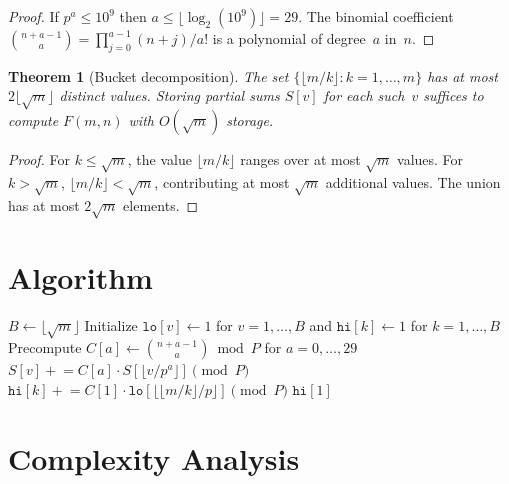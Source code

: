 \documentclass[12pt,a4paper]{article}
\newtheorem{theorem}{Theorem}
\newcommand{\Fmn}{F(m,n)}
\begin{document}
\begin{proof}
If $p^a \le 10^9$ then $a \le \lfloor \log_2(10^9) \rfloor = 29$. The binomial coefficient $\binom{n+a-1}{a} = \prod_{j=0}^{a-1} (n+j) / a!$ is a polynomial of degree~$a$ in~$n$.
\end{proof}

\begin{theorem}[Bucket decomposition]\label{thm:bucket}
The set $\{\lfloor m/k \rfloor : k = 1, \ldots, m\}$ has at most $2\lfloor\sqrt{m}\rfloor$ distinct values. Storing partial sums $S[v]$ for each such~$v$ suffices to compute $\Fmn$ with $O(\sqrt{m})$ storage.
\end{theorem}

\begin{proof}
For $k \le \sqrt{m}$, the value $\lfloor m/k \rfloor$ ranges over at most $\sqrt{m}$ values. For $k > \sqrt{m}$, $\lfloor m/k \rfloor < \sqrt{m}$, contributing at most $\sqrt{m}$ additional values. The union has at most $2\sqrt{m}$ elements.
\end{proof}

\section{Algorithm}

\begin{algorithm}[H]
\caption{Compute $\Fmn \bmod P$ via multiplicative bucket sieve}
\begin{algorithmic}[1]
\State $B \gets \lfloor\sqrt{m}\rfloor$
\State Initialize $\texttt{lo}[v] \gets 1$ for $v = 1, \ldots, B$ and $\texttt{hi}[k] \gets 1$ for $k = 1, \ldots, B$
\State Precompute $C[a] \gets \binom{n+a-1}{a} \bmod P$ for $a = 0, \ldots, 29$
 
            \State $S[v] \mathrel{+}= C[a] \cdot S[\lfloor v/p^a \rfloor] \pmod{P}$
        \EndFor
    \EndFor
\EndFor
\For{each prime $p \in (B, m]$ via segmented sieve} 
        \State $\texttt{hi}[k] \mathrel{+}= C[1] \cdot \texttt{lo}[\lfloor \lfloor m/k \rfloor / p \rfloor] \pmod{P}$
    \EndFor
\EndFor
\State \Return $\texttt{hi}[1]$
\end{algorithmic}
\end{algorithm}

\section{Complexity Analysis}
\end{document}
